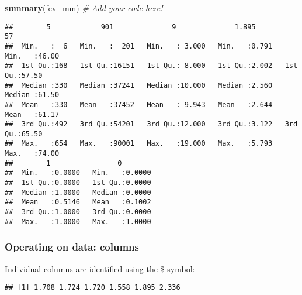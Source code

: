 \documentclass[
]{article}
\newenvironment{Shaded}{\begin{snugshade}}{\end{snugshade}}
\newcommand{\CommentTok}[1]{\textcolor[rgb]{0.56,0.35,0.01}{\textit{#1}}}
\newcommand{\FunctionTok}[1]{\textcolor[rgb]{0.13,0.29,0.53}{\textbf{#1}}}
\newcommand{\NormalTok}[1]{#1}
\newcommand{\SpecialCharTok}[1]{\textcolor[rgb]{0.81,0.36,0.00}{\textbf{#1}}}
\begin{document}
\begin{Shaded}
\begin{Highlighting}[]
\FunctionTok{summary}\NormalTok{(fev\_mm) }\CommentTok{\# Add your code here!}
\end{Highlighting}
\end{Shaded}

\begin{verbatim}
##        5            901              9              1.895             57       
##  Min.   :  6   Min.   :  201   Min.   : 3.000   Min.   :0.791   Min.   :46.00  
##  1st Qu.:168   1st Qu.:16151   1st Qu.: 8.000   1st Qu.:2.002   1st Qu.:57.50  
##  Median :330   Median :37241   Median :10.000   Median :2.560   Median :61.50  
##  Mean   :330   Mean   :37452   Mean   : 9.943   Mean   :2.644   Mean   :61.17  
##  3rd Qu.:492   3rd Qu.:54201   3rd Qu.:12.000   3rd Qu.:3.122   3rd Qu.:65.50  
##  Max.   :654   Max.   :90001   Max.   :19.000   Max.   :5.793   Max.   :74.00  
##        1                0         
##  Min.   :0.0000   Min.   :0.0000  
##  1st Qu.:0.0000   1st Qu.:0.0000  
##  Median :1.0000   Median :0.0000  
##  Mean   :0.5146   Mean   :0.1002  
##  3rd Qu.:1.0000   3rd Qu.:0.0000  
##  Max.   :1.0000   Max.   :1.0000
\end{verbatim}

\subsubsection{Operating on data:
columns}\label{operating-on-data-columns}

Individual columns are identified using the \$ symbol:

\begin{Shaded}
\end{Shaded}

\begin{verbatim}
## [1] 1.708 1.724 1.720 1.558 1.895 2.336
\end{verbatim}

\begin{Shaded}
\end{Shaded}
\end{document}
